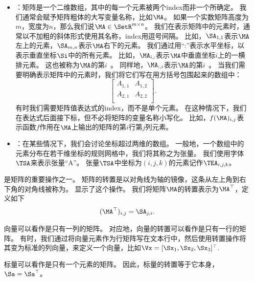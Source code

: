 \begin{itemize}
    \item {}：矩阵是一个二维数组，其中的每一个元素被两个\gls{index}而非一个所确定。
    我们通常会赋予矩阵粗体的大写变量名称，比如$\MA$。
    如果一个实数矩阵高度为$m$，宽度为$n$，那么我们说$\MA\in \SetR^{m\times n}$。
    我们在表示矩阵中的元素时，通常以不加粗的斜体形式使用其名称，\gls{index}用逗号间隔。
    比如，$\SA_{1,1}$表示$\MA$左上的元素，$\SA_{m,n}$表示$\MA$右下的元素。
    我们通过用``:''表示水平坐标，以表示垂直坐标$\Si$中的所有元素。
    比如，$\MA_{i,:}$表示$\MA$中垂直坐标$i$上的一横排元素。
    这也被称为$\MA$的第$i$~。
    同样地，$\MA_{:,i}$表示$\MA$的第$i$~。
    当我们需要明确表示矩阵中的元素时，我们将它们写在用方括号包围起来的数组中：
    \begin{equation}
        \begin{bmatrix}
            A_{1,1} & A_{1,2} \\
            A_{2,1} & A_{2,2} \\
        \end{bmatrix}.
    \end{equation}
    有时我们需要矩阵值表达式的\gls{index}，而不是单个元素。
    在这种情况下，我们在表达式后面接下标，但不必将矩阵的变量名称小写化。
    比如，$f(\MA)_{i,j}$表示函数$f$作用在$\MA$上输出的矩阵的第$i$行第$j$列元素。


    \item {}：在某些情况下，我们会讨论坐标超过两维的数组。
    一般地，一个数组中的元素分布在若干维坐标的规则网格中，我们将其称之为张量。
    我们使用字体$\TSA$来表示张量``A''。
    张量$\TSA$中坐标为$(i,j,k)$的元素记作$\TEA_{i,j,k}$。
\end{itemize}


是矩阵的重要操作之一。
矩阵的转置是以对角线为轴的镜像，这条从左上角到右下角的对角线被称为。
显示了这个操作。
我们将矩阵$\MA$的转置表示为$\MA^\top$，定义如下
\begin{equation}
(\MA^\top)_{i,j}= \SA_{j,i}.
\end{equation}

向量可以看作是只有一列的矩阵。
对应地，向量的转置可以看作是只有一行的矩阵。
有时，我们通过将向量元素作为行矩阵写在文本行中，然后使用转置操作将其变为标准的列向量，来定义一个向量，比如$\Vx=[\Sx_1, \Sx_2, \Sx_3]^\top$.


标量可以看作是只有一个元素的矩阵。
因此，标量的转置等于它本身，$\Sa=\Sa^\top$。


